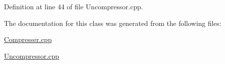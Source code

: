 \-Definition at line 44 of file \-Uncompressor.\-cpp.



\-The documentation for this class was generated from the following files\-:\begin{DoxyCompactItemize}
\item 
\hyperlink{_compresser_8cpp}{\-Compresser.\-cpp}\item 
\hyperlink{_uncompressor_8cpp}{\-Uncompressor.\-cpp}\end{DoxyCompactItemize}
